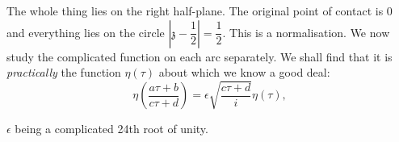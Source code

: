 \medskip
\noindent
\begin{minipage}{4.5cm}
 The whole thing lies on the right half-plane. The original
point of contact is 0 and everything lies on the circle
$|\mathfrak{z}- \dfrac{1}{2}| = \dfrac{1}{2}$. This is a
normalisation. We now study the complicated function on each arc
separately. We shall find that it is \textit{practically} the function
$\eta(\tau)$  about which we know a good deal:
$$
\eta \left( \frac{a \tau +b}{c \tau+d} \right)= \epsilon \sqrt{\frac{c \tau
  +d}{i}} \eta ( \tau), 
$$
\end{minipage}
\begin{minipage}{5.5cm}
\begin{figure}[H]
\end{figure}
\end{minipage}
$\epsilon$ being a complicated 24th root of unity.
